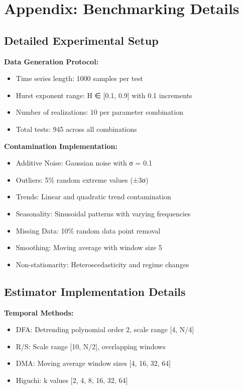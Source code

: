 \section*{Appendix: Benchmarking Details}

\subsection{Detailed Experimental Setup}

\textbf{Data Generation Protocol:}
\begin{itemize}
    \item Time series length: 1000 samples per test
    \item Hurst exponent range: H ∈ [0.1, 0.9] with 0.1 increments
    \item Number of realizations: 10 per parameter combination
    \item Total tests: 945 across all combinations
\end{itemize}

\textbf{Contamination Implementation:}
\begin{itemize}
    \item Additive Noise: Gaussian noise with σ = 0.1
    \item Outliers: 5\% random extreme values (±3σ)
    \item Trends: Linear and quadratic trend contamination
    \item Seasonality: Sinusoidal patterns with varying frequencies
    \item Missing Data: 10\% random data point removal
    \item Smoothing: Moving average with window size 5
    \item Non-stationarity: Heteroscedasticity and regime changes
\end{itemize}

\subsection{Estimator Implementation Details}

\textbf{Temporal Methods:}
\begin{itemize}
    \item DFA: Detrending polynomial order 2, scale range [4, N/4]
    \item R/S: Scale range [10, N/2], overlapping windows
    \item DMA: Moving average window sizes [4, 16, 32, 64]
    \item Higuchi: k values [2, 4, 8, 16, 32, 64]
\end{itemize}

